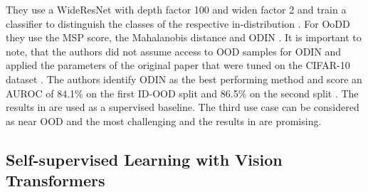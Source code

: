 They use a WideResNet \citep{Zagoruyko2016} with depth factor 100 and widen factor 2 and train a classifier to distinguish the classes of the respective in-distribution \citep{Berger2021}.
For OoDD they use the MSP score, the Mahalanobis distance and ODIN \citep{Berger2021}.
It is important to note, that the authors did not assume access to OOD samples for ODIN and applied the parameters of the original paper that were tuned on the CIFAR-10 \citep{Krizhevsky2009b} dataset \citep{Liang2018}.
The authors identify ODIN as the best performing method and score an AUROC of 84.1\% on the first ID-OOD split and 86.5\% on the second split \citep{Berger2021}.
The results in \citep{Berger2021} are used as a supervised baseline.
The third use case can be considered as near OOD and the most challenging and the results in \citep{Berger2021} are promising.
\par
\subsection{Self-supervised Learning with Vision Transformers}
\label{section: SSL}

